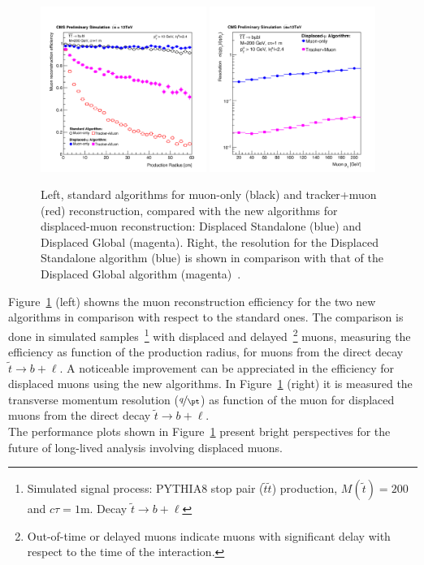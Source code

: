 \begin{figure}[h!]
\centering
  \includegraphics[clip,trim=0cm 0cm 0cm 2cm, width=0.48\textwidth]{Figures/c2/newreco.pdf}
  \includegraphics[clip,trim=0cm 0cm 0cm 2cm, width=0.48\textwidth]{Figures/c2/newreco2.pdf}
  \caption{Left, standard algorithms for muon-only (black) and tracker+muon (red) reconstruction,
compared with the new algorithms for displaced-muon reconstruction: Displaced
Standalone (blue) and Displaced Global
(magenta). Right, the resolution for the Displaced Standalone algorithm (blue) is shown in comparison
with that of the Displaced Global algorithm (magenta)~\cite{CMS-DP-2015-015}.}
  \label{fig:newreco}
\end{figure}

Figure~\ref{fig:newreco} (left) showns the muon reconstruction
efficiency for the two new algorithms in comparison with respect to
the standard ones. The comparison is done in 
simulated samples~\footnote{Simulated signal process: PYTHIA8 stop 
  pair ($\tilde{t}\tilde{t}$) production, $M(\tilde{t}) = 200$\GeV and
$c\tau=1$m. Decay $\tilde{t} \rightarrow b + \ell$} with displaced and
delayed~\footnote{Out-of-time or delayed muons indicate muons with significant delay with respect to the time of the
interaction.} muons, measuring the efficiency as function of the production radius, for muons from
the direct decay $\tilde{t} \rightarrow b + \ell$. A noticeable
improvement can be appreciated in the efficiency for displaced muons
using the new algorithms. In Figure~\ref{fig:newreco} (right) it is
measured the transverse momentum resolution ($\nicefrac{q}{\pt}$) as
function of the muon \pt for displaced muons from the direct decay $\tilde{t} \rightarrow b + \ell$.\\
The performance plots shown in Figure~\ref{fig:newreco} present bright
perspectives for the future of long-lived analysis involving
displaced muons. 

